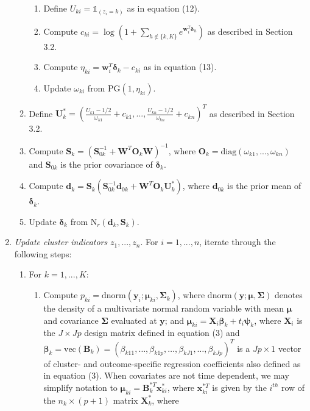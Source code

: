 \documentclass[useAMS,11pt]{article}
\newcommand{\1}{\mathbbm{1}}
\begin{document}
\begin{enumerate}
\begin{enumerate}
		\begin{enumerate}
			\item Define $U_{ki} = \mathds{1}_{(z_i = k)}$ as in equation (12).
			\item Compute $c_{ki} = \log (1 + \sum_{h \notin \{k,K \}}e^{\mathbf{w}_i^T \boldsymbol\delta_h})$ as described in Section 3.2.
			\item Compute $\eta_{ki} = \mathbf{w}_i^T \boldsymbol\delta_{k} - c_{ki}$ as in equation (13).
			\item Update $\omega_{ki}$ from $\text{PG}(1,\eta_{ki})$.
		\end{enumerate}	
		\item Define $\mathbf{U}^*_{k} = \left( \frac{U_{k1}-1/2}{\omega_{k1}} + c_{k1},...,\frac{U_{kn}-1/2}{\omega_{kn}} + c_{kn} \right )^T$ as described in Section 3.2.
		\item Compute $\mathbf{S}_{k} = (\mathbf{S}^{-1}_{0k} + \mathbf{W}^T\mathbf{O}_k\mathbf{W})^{-1}$, where $\mathbf{O}_k = \text{diag}(\omega_{k1},...,\omega_{kn})$ and $\mathbf{S}_{0k}$ is the prior covariance of $\boldsymbol\delta_k$.
		\item Compute $\mathbf{d}_{k} = \mathbf{S}_{k}(\mathbf{S}^{-1}_{0k}\mathbf{d}_{0k} + \mathbf{W}^T \mathbf{O}_k \mathbf{U}^*_k)$, where $\mathbf{d}_{0k}$ is the prior mean of $\boldsymbol\delta_k$.
		\item Update $\boldsymbol\delta_k$ from $\text{N}_r(\mathbf{d}_{k},\mathbf{S}_{k})$.
	\end{enumerate}
	\item \textit{Update cluster indicators} $z_1,...,z_n$. For $i = 1,...,n$, iterate through the following steps:
	\begin{enumerate}
		\item For $k = 1,...,K$:
		\begin{enumerate}
			\item Compute $p_{ki} = \text{dnorm}(\mathbf{y}_i;\boldsymbol\mu_{ki},\boldsymbol\Sigma_k)$, where $\text{dnorm}(\mathbf{y};\boldsymbol\mu,\boldsymbol\Sigma)$ denotes the density of a multivariate normal
            random variable with mean $\boldsymbol\mu$ and covariance $\boldsymbol\Sigma$ evaluated at $\mathbf{y}$; and $\boldsymbol\mu_{ki} = \mathbf{X}_i \boldsymbol\beta_k + t_i\boldsymbol\psi_k$, where $\mathbf{X}_i$ is the $J \times Jp$ design matrix defined in equation (3) and \break $\boldsymbol{\beta}_k=\text{vec}(\mathbf{B}_k) = (\beta_{k11},\ldots,\beta_{k1p},\ldots,\beta_{kJ1},\ldots,\beta_{kJp})^T$ is a $Jp\times 1$ vector of cluster- and outcome-specific regression coefficients also defined as in equation (3). When covariates are not time dependent, we may simplify notation to $\boldsymbol\mu_{ki} = \mathbf{B}^{*T}_k \mathbf{x}^{*}_{ki}$, where $\mathbf{x}^{*T}_{ki}$ is given by the $i^{th}$ row of the $n_k \times (p+1)$ matrix $\mathbf{X}^*_k$, where

\end{enumerate}
\end{enumerate}
\end{enumerate}
\end{document}

